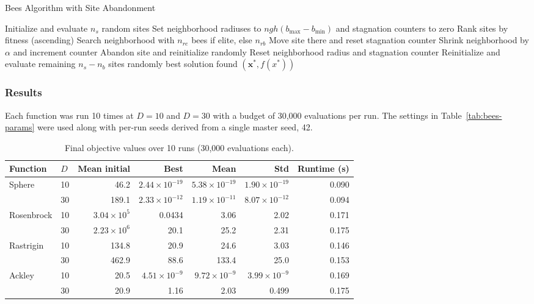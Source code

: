 \begin{algorithm}[H]
\caption{Bees Algorithm with Site Abandonment}
\label{alg:beesfunc}
\begin{algorithmic}[1]
\State Initialize and evaluate $n_s$ random sites
\State Set neighborhood radiuses to $ngh(b_{\max}-b_{\min})$ and stagnation counters to zero
    \State Rank sites by fitness (ascending)
        \State Search neighborhood with $n_{re}$ bees if elite, else $n_{rb}$
            \State Move site there and reset stagnation counter
        \Else
            \State Shrink neighborhood by $\alpha$ and increment counter
                \State Abandon site and reinitialize randomly
                \State Reset neighborhood radius and stagnation counter
            \EndIf
        \EndIf
    \EndFor
    \State Reinitialize and evaluate remaining $n_s - n_b$ sites randomly
\EndWhile
\State \Return best solution found $(\mathbf{x}^*, f(x^*))$
\end{algorithmic}
\end{algorithm}

\subsubsection{Results}

Each function was run 10 times at $D=10$ and $D=30$ with a budget of 30,000 evaluations per run.
The settings in Table~\ref{tab:bees-params} were used along with per-run seeds derived from a single master seed, 42.

\begin{table}[ht]
\centering
\caption{Final objective values over 10 runs (30,000 evaluations each).}
\label{tab:bafuncsummary}
\begin{tabular}{llrrrrr}
\toprule
Function & $D$ & Mean initial & Best & Mean & Std & Runtime (s) \\
\midrule
Sphere     & 10 & 46.2 & $2.44\times10^{-19}$ & $5.38\times10^{-19}$ & $1.90\times10^{-19}$ & 0.090 \\
           & 30 & 189.1 & $2.33\times10^{-12}$ & $1.19\times10^{-11}$ & $8.07\times10^{-12}$ & 0.094 \\
Rosenbrock & 10 & $3.04\times10^{5}$ & 0.0434 & 3.06 & 2.02 & 0.171 \\
           & 30 & $2.23\times10^{6}$ & 20.1 & 25.2 & 2.31 & 0.175 \\
Rastrigin  & 10 & 134.8 & 20.9 & 24.6 & 3.03 & 0.146 \\
           & 30 & 462.9 & 88.6 & 133.4 & 25.0 & 0.153 \\
Ackley     & 10 & 20.5 & $4.51\times10^{-9}$ & $9.72\times10^{-9}$ & $3.99\times10^{-9}$ & 0.169 \\
           & 30 & 20.9 & 1.16 & 2.03 & 0.499 & 0.175 \\
\bottomrule
\end{tabular}
\end{table}

